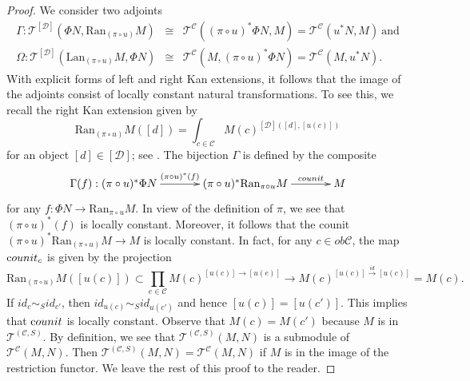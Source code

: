 \documentclass{amsart}
\theoremstyle{definition}
\theoremstyle{remark}
\newcommand{\C}{{\mathcal C}}
\newcommand{\T}{{\mathcal T}}
\newcommand{\D}{\mathcal{D}}
\newcounter{eqn}[section]
\begin{document}
\begin{proof} 
We consider two adjoints 
\begin{eqnarray*}
\Gamma :  \T^{[\D]}(\Phi N, \text{Ran}_{(\pi\circ u)}M) &\cong&  \T^{\C}((\pi\circ u)^* \Phi N, M)=\T^{\C}(u^*N, M) \  \text{and}\\
\Omega : \T^{[\D]}(\text{Lan}_{(\pi\circ u)}M, \Phi N) &\cong&  \T^{\C}(M, (\pi\circ u)^* \Phi N)=\T^{\C}(M, u^*N).
\end{eqnarray*}
With explicit forms of left and right Kan extensions, it follows that the image of the adjoints consist of locally 
constant natural transformations. To see this, 
we recall the right Kan extension given by 
$$
\text{Ran}_{(\pi\circ u)}M ([d]) =\int_{c\in \C}M(c)^{[\D]([d], [u(c)])}
$$
for an object $[d] \in [\D]$; see \cite[X]{M}. 
The bijection $\Gamma$ is defined by the composite 
$$
\xymatrix@C35pt@R20pt{
\Gamma(f) : (\pi\circ u)^* \Phi N \ar[r]^-{(\pi\circ u)^*(f)} & (\pi\circ u)^*\text{Ran}_{\pi\circ u}M \ar[r]^-{counit} &
M
}
$$
for any $f : \Phi N \to \text{Ran}_{\pi\circ u}M$.  In view of the definition of $\pi$, 
we see that $(\pi\circ u)^*(f)$ is locally constant. 
Moreover, it follows that 
the counit $(\pi\circ u)^*\text{Ran}_{(\pi\circ u)}M \to M$ is locally constant. 
In fact, for any $c \in ob \C$, the map ${\text counit}_c$ is given by the projection 
$$
\text{Ran}_{(\pi\circ u)}M ([u(c)]) \subset \prod_{e\in \C} M(c)^{[u(c)] \stackrel{}{\to} [u(e)]} \to M(c)^{[u(c)] \stackrel{id}{\to} [u(c)]}
=M(c). 
$$
If $id_c \sim_S id_{c'}$, then $id_{u(c)}\sim_S id_{u(c')}$ and hence $[u(c)] = [u(c')]$. This implies that 
${\text counit}$ is locally constant. Observe that $M(c) =M(c')$ because $M$ is in $\T^{(\C, S)}$.
By definition, we see that $\T^{(\C, S)}(M, N)$ is a submodule of $\T^{\C}(M, N)$. 
Then $\T^{(\C, S)}(M, N)=\T^{\C}(M, N)$ if $M$ is in the image of the restriction functor. 
We leave the rest of this proof to the reader. 
\end{proof}
\end{document}
